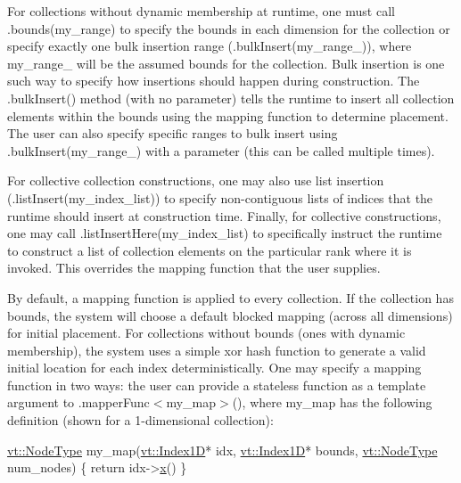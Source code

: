 For collections without dynamic membership at runtime, one must call {\ttfamily .bounds(my\+\_\+range)} to specify the bounds in each dimension for the collection or specify exactly one bulk insertion range ({\ttfamily .bulk\+Insert(my\+\_\+range\+\_)}), where {\ttfamily my\+\_\+range\+\_} will be the assumed bounds for the collection. Bulk insertion is one such way to specify how insertions should happen during construction. The {\ttfamily .bulk\+Insert()} method (with no parameter) tells the runtime to insert all collection elements within the bounds using the mapping function to determine placement. The user can also specify specific ranges to bulk insert using {\ttfamily .bulk\+Insert(my\+\_\+range\+\_)} with a parameter (this can be called multiple times).

For collective collection constructions, one may also use list insertion ({\ttfamily .list\+Insert(my\+\_\+index\+\_\+list)}) to specify non-\/contiguous lists of indices that the runtime should insert at construction time. Finally, for collective constructions, one may call {\ttfamily .list\+Insert\+Here(my\+\_\+index\+\_\+list)} to specifically instruct the runtime to construct a list of collection elements on the particular rank where it is invoked. This overrides the mapping function that the user supplies.

By default, a mapping function is applied to every collection. If the collection has bounds, the system will choose a default blocked mapping (across all dimensions) for initial placement. For collections without bounds (ones with dynamic membership), the system uses a simple xor hash function to generate a valid initial location for each index deterministically. One may specify a mapping function in two ways\+: the user can provide a stateless function as a template argument to {\ttfamily .mapper\+Func$<$my\+\_\+map$>$()}, where {\ttfamily my\+\_\+map} has the following definition (shown for a 1-\/dimensional collection)\+:


\begin{DoxyCode}
\hyperlink{namespacevt_a866da9d0efc19c0a1ce79e9e492f47e2}{vt::NodeType} my\_map(\hyperlink{structvt_1_1index_1_1_dense_index_array}{vt::Index1D}* idx, \hyperlink{structvt_1_1index_1_1_dense_index_array}{vt::Index1D}* bounds, 
      \hyperlink{namespacevt_a866da9d0efc19c0a1ce79e9e492f47e2}{vt::NodeType} num\_nodes) \{
  \textcolor{keywordflow}{return} idx->\hyperlink{structvt_1_1index_1_1_dense_index_array_a0604b24914af854d09d4da97eae4ef74}{x}() %
\}
\end{DoxyCode}


